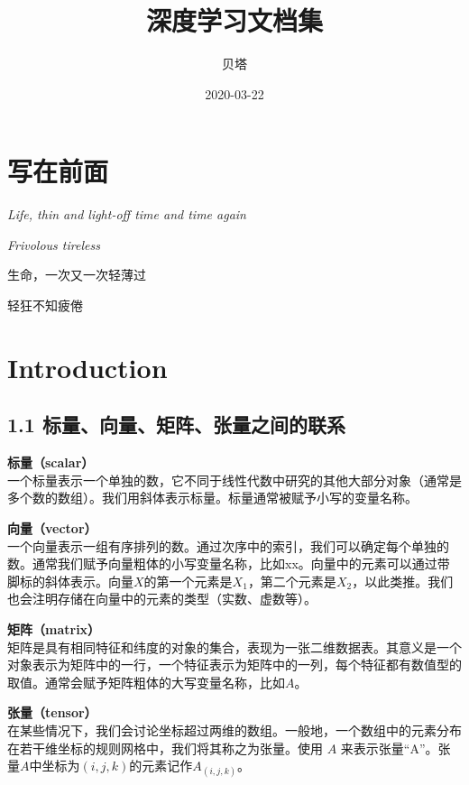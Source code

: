 \documentclass[]{book}
\title{深度学习文档集}
\author{贝塔}
\date{2020-03-22}
\begin{document}
\maketitle

{
\setcounter{tocdepth}{1}
\tableofcontents
}
\chapter{写在前面}\label{ux5199ux5728ux524dux9762}

\emph{Life, thin and light-off time and time again}

\emph{Frivolous tireless}

生命，一次又一次轻薄过

轻狂不知疲倦

\chapter{Introduction}\label{intro}

\section{1.1
标量、向量、矩阵、张量之间的联系}\label{ux6807ux91cfux5411ux91cfux77e9ux9635ux5f20ux91cfux4e4bux95f4ux7684ux8054ux7cfb}

\textbf{标量（scalar）}\\
一个标量表示一个单独的数，它不同于线性代数中研究的其他大部分对象（通常是多个数的数组）。我们用斜体表示标量。标量通常被赋予小写的变量名称。

\textbf{向量（vector）}\\
​一个向量表示一组有序排列的数。通过次序中的索引，我们可以确定每个单独的数。通常我们赋予向量粗体的小写变量名称，比如xx。向量中的元素可以通过带脚标的斜体表示。向量\(X\)的第一个元素是\(X_1\)，第二个元素是\(X_2\)，以此类推。我们也会注明存储在向量中的元素的类型（实数、虚数等）。

\textbf{矩阵（matrix）}\\
​矩阵是具有相同特征和纬度的对象的集合，表现为一张二维数据表。其意义是一个对象表示为矩阵中的一行，一个特征表示为矩阵中的一列，每个特征都有数值型的取值。通常会赋予矩阵粗体的大写变量名称，比如\(A\)。

\textbf{张量（tensor）}\\
​在某些情况下，我们会讨论坐标超过两维的数组。一般地，一个数组中的元素分布在若干维坐标的规则网格中，我们将其称之为张量。使用
\(A\)
来表示张量``A''。张量\(A\)中坐标为\((i,j,k)\)的元素记作\(A_{(i,j,k)}\)。
\end{document}

